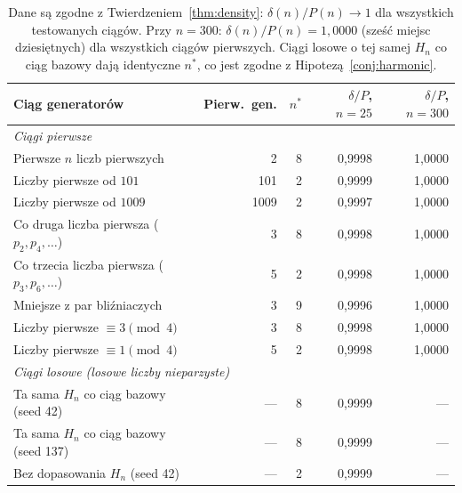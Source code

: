 \begin{table}[H]
\centering
\footnotesize
\begin{tabular}{lrrrr}
\toprule
Ciąg generatorów & Pierw.\ gen. & $n^*$
  & $\delta/P$, $n=25$ & $\delta/P$, $n=300$ \\
\midrule
\multicolumn{5}{l}{\textit{Ciągi pierwsze}} \\
Pierwsze $n$ liczb pierwszych &    2 & 8 & 0{,}9998 & 1{,}0000 \\
Liczby pierwsze od $101$      &  101 & 2 & 0{,}9999 & 1{,}0000 \\
Liczby pierwsze od $1009$     & 1009 & 2 & 0{,}9997 & 1{,}0000 \\
Co druga liczba pierwsza ($p_2, p_4, \ldots$) &    3 & 8 & 0{,}9998 & 1{,}0000 \\
Co trzecia liczba pierwsza ($p_3, p_6, \ldots$) &  5 & 2 & 0{,}9998 & 1{,}0000 \\
Mniejsze z par bliźniaczych   &    3 & 9 & 0{,}9996 & 1{,}0000 \\
Liczby pierwsze $\equiv 3 \pmod{4}$ &  3 & 8 & 0{,}9998 & 1{,}0000 \\
Liczby pierwsze $\equiv 1 \pmod{4}$ &  5 & 2 & 0{,}9998 & 1{,}0000 \\
\multicolumn{5}{l}{\textit{Ciągi losowe (losowe liczby nieparzyste)}} \\
Ta sama $H_n$ co ciąg bazowy (seed 42)  & {---} & 8 & 0{,}9999 & {---} \\
Ta sama $H_n$ co ciąg bazowy (seed 137) & {---} & 8 & 0{,}9999 & {---} \\
Bez dopasowania $H_n$ (seed 42)         & {---} & 2 & 0{,}9999 & {---} \\
\bottomrule
\end{tabular}
\caption{Dane są zgodne z Twierdzeniem~\ref{thm:density}:
$\delta(n)/P(n) \to 1$ dla wszystkich testowanych ciągów.
Przy $n=300$: $\delta(n)/P(n) = 1{,}0000$ (sześć miejsc dziesiętnych)
dla wszystkich ciągów pierwszych.
Ciągi losowe o tej samej $H_n$ co ciąg bazowy dają identyczne $n^*$,
co jest zgodne z Hipotezą~\ref{conj:harmonic}.}
\label{tab:sequences}
\end{table}